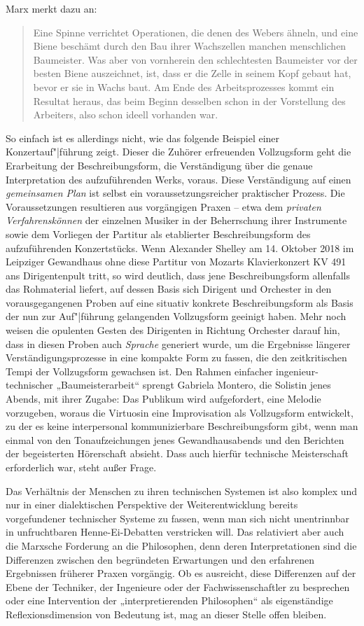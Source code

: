 \documentclass[11pt,a4paper]{article}
\begin{document}
Marx \cite[S. 193]{MEW23} merkt dazu an:
\begin{quote}
  Eine Spinne verrichtet Operationen, die denen des Webers ähneln, und eine
  Biene beschämt durch den Bau ihrer Wachszellen manchen menschlichen
  Baumeister. Was aber von vornherein den schlechtesten Baumeister vor der
  besten Biene auszeichnet, ist, dass er die Zelle in seinem Kopf gebaut hat,
  bevor er sie in Wachs baut. Am Ende des Arbeitsprozesses kommt ein Resultat
  heraus, das beim Beginn desselben schon in der Vorstellung des Arbeiters,
  also schon ideell vorhanden war.
\end{quote}
So einfach ist es allerdings nicht, wie das folgende Beispiel einer
Konzertauf"|führung zeigt. Dieser die Zuhörer erfreuenden Vollzugsform geht
die Erarbeitung der Beschreibungsform, die Verständigung über die genaue
Interpretation des aufzuführenden Werks, voraus. Diese Verständigung auf einen
\emph{gemeinsamen Plan} ist selbst ein voraussetzungsreicher praktischer
Prozess.  Die Voraussetzungen resultieren aus vorgängigen Praxen -- etwa dem
\emph{privaten Verfahrenskönnen} der einzelnen Musiker in der Beherrschung
ihrer Instrumente sowie dem Vorliegen der Partitur als etablierter
Beschreibungsform des aufzuführenden Konzertstücks.  Wenn Alexander Shelley am
14. Oktober 2018 im Leipziger Gewandhaus ohne diese Partitur von Mozarts
Klavierkonzert KV 491 ans Dirigentenpult tritt, so wird deutlich, dass jene
Beschreibungsform allenfalls das Rohmaterial liefert, auf dessen Basis sich
Dirigent und Orchester in den vorausgegangenen Proben auf eine situativ
konkrete Beschreibungsform als Basis der nun zur Auf"|führung gelangenden
Vollzugsform geeinigt haben. Mehr noch weisen die opulenten Gesten des
Dirigenten in Richtung Orchester darauf hin, dass in diesen Proben auch
\emph{Sprache} generiert wurde, um die Ergebnisse längerer
Verständigungsprozesse in eine kompakte Form zu fassen, die den zeitkritischen
Tempi der Vollzugsform gewachsen ist.  Den Rahmen einfacher
ingenieur-technischer „Baumeisterarbeit“ sprengt Gabriela Montero, die
Solistin jenes Abends, mit ihrer Zugabe: Das Publikum wird aufgefordert, eine
Melodie vorzugeben, woraus die Virtuosin eine Improvisation als Vollzugsform
entwickelt, zu der es keine interpersonal kommunizierbare Beschreibungsform
gibt, wenn man einmal von den Tonaufzeichungen jenes Gewandhausabends und den
Berichten der begeisterten Hörerschaft absieht.  Dass auch hierfür technische
Meisterschaft erforderlich war, steht außer Frage.

Das Verhältnis der Menschen zu ihren technischen Systemen ist also komplex und
nur in einer dialektischen Perspektive der Weiterentwicklung bereits
vorgefundener technischer Systeme zu fassen, wenn man sich nicht unentrinnbar
in unfruchtbaren Henne-Ei-Debatten verstricken will.  Das relativiert aber
auch die Marxsche Forderung an die Philosophen, denn deren Interpretationen
sind die Differenzen zwischen den begründeten Erwartungen und den erfahrenen
Ergebnissen früherer Praxen vorgängig. Ob es ausreicht, diese Differenzen auf
der Ebene der Techniker, der Ingenieure oder der Fachwissenschaftler zu
besprechen oder eine Intervention der „interpretierenden Philosophen“ als
eigenständige Reflexionsdimension von Bedeutung ist, mag an dieser Stelle
offen bleiben.
\end{document}
